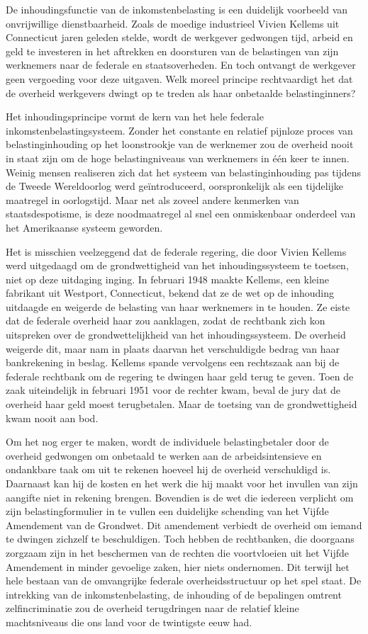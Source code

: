 \documentclass[
  a5paper,
  smalldemyvopaper,10pt,twoside,onecolumn,openright,extrafontsizes,hidelinks]{memoir}
\begin{document}
De inhoudingsfunctie van de inkomstenbelasting is een duidelijk
voorbeeld van onvrijwillige dienstbaarheid. Zoals de moedige industrieel
Vivien Kellems uit Connecticut jaren geleden stelde, wordt de werkgever
gedwongen tijd, arbeid en geld te investeren in het aftrekken en
doorsturen van de belastingen van zijn werknemers naar de federale en
staatsoverheden. En toch ontvangt de werkgever geen vergoeding voor deze
uitgaven. Welk moreel principe rechtvaardigt het dat de overheid
werkgevers dwingt op te treden als haar onbetaalde belastinginners?

Het inhoudingsprincipe vormt de kern van het hele federale
inkomstenbelastingsysteem. Zonder het constante en relatief pijnloze
proces van belastinginhouding op het loonstrookje van de werknemer zou
de overheid nooit in staat zijn om de hoge belastingniveaus van
werknemers in één keer te innen. Weinig mensen realiseren zich dat het
systeem van belastinginhouding pas tijdens de Tweede Wereldoorlog werd
geïntroduceerd, oorspronkelijk als een tijdelijke maatregel in
oorlogstijd. Maar net als zoveel andere kenmerken van staatsdespotisme,
is deze noodmaatregel al snel een onmiskenbaar onderdeel van het
Amerikaanse systeem geworden.

Het is misschien veelzeggend dat de federale regering, die door Vivien
Kellems werd uitgedaagd om de grondwettigheid van het inhoudingssysteem
te toetsen, niet op deze uitdaging inging. In februari 1948 maakte
Kellems, een kleine fabrikant uit Westport, Connecticut, bekend dat ze
de wet op de inhouding uitdaagde en weigerde de belasting van haar
werknemers in te houden. Ze eiste dat de federale overheid haar zou
aanklagen, zodat de rechtbank zich kon uitspreken over de
grondwettelijkheid van het inhoudingssysteem. De overheid weigerde dit,
maar nam in plaats daarvan het verschuldigde bedrag van haar
bankrekening in beslag. Kellems spande vervolgens een rechtszaak aan bij
de federale rechtbank om de regering te dwingen haar geld terug te
geven. Toen de zaak uiteindelijk in februari 1951 voor de rechter kwam,
beval de jury dat de overheid haar geld moest terugbetalen. Maar de
toetsing van de grondwettigheid kwam nooit aan bod.

Om het nog erger te maken, wordt de individuele belastingbetaler door de
overheid gedwongen om onbetaald te werken aan de arbeidsintensieve en
ondankbare taak om uit te rekenen hoeveel hij de overheid verschuldigd
is. Daarnaast kan hij de kosten en het werk die hij maakt voor het
invullen van zijn aangifte niet in rekening brengen. Bovendien is de wet
die iedereen verplicht om zijn belastingformulier in te vullen een
duidelijke schending van het Vijfde Amendement van de Grondwet. Dit
amendement verbiedt de overheid om iemand te dwingen zichzelf te
beschuldigen. Toch hebben de rechtbanken, die doorgaans zorgzaam zijn in
het beschermen van de rechten die voortvloeien uit het Vijfde Amendement
in minder gevoelige zaken, hier niets ondernomen. Dit terwijl het hele
bestaan van de omvangrijke federale overheidsstructuur op het spel
staat. De intrekking van de inkomstenbelasting, de inhouding of de
bepalingen omtrent zelfincriminatie zou de overheid terugdringen naar de
relatief kleine machtsniveaus die ons land voor de twintigste eeuw had.
\end{document}
